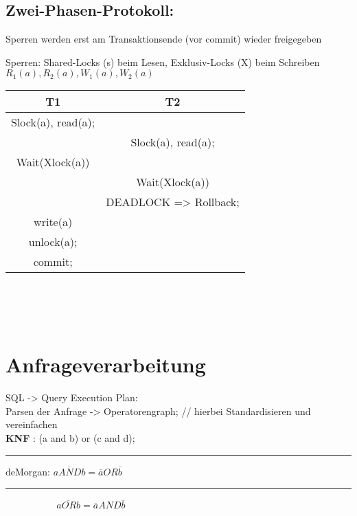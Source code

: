 \subsection{Zwei-Phasen-Protokoll:} Sperren werden erst am Transaktionsende (vor commit) wieder freigegeben

Sperren: Shared-Locks (s) beim Lesen, Exklusiv-Locks (X) beim Schreiben
$R_1(a),R_2(a),W_1(a),W_2(a)$

\begin{tabular}{|c|c|}
\hline
T1 & T2 \\
\hline
Slock(a), read(a); & \\
& Slock(a), read(a);\\
Wait(Xlock(a)) & \\
& Wait(Xlock(a))\\
& DEADLOCK => Rollback;\\
write(a)&\\
unlock(a);&\\
commit;&\\
\hline
\end{tabular}\\ \\ \\



\section{Anfrageverarbeitung}

SQL -> Query Execution Plan:\\
Parsen der Anfrage -> Operatorengraph; // hierbei Standardisieren und vereinfachen  \\
\textbf{KNF} : (a and b) or (c and d); \\
\rule{2em}{0em}deMorgan: $\overline{a AND b} = \overline{a} OR \overline{b}$\\
\rule{2em}{0em}\textcolor{white}{deMorgan :} $\overline{a OR b} = \overline{a} AND \overline{b}$

\newcommand{\proj}{\textcolor{red}{\ensuremath{\pi_{k.nr,p.nr}}}}
\newcommand{\joink}{\textcolor{darkgreen}{\ensuremath{\bowtie_{k.knr = a.knr}}}}
\newcommand{\joina}{\textcolor{darkgreen}{\ensuremath{\bowtie_{a.anr = p.anr}}}}
\newcommand{\selk}{\textcolor{blue}{\ensuremath{\sigma_{k.name = 'x'}} }}
\newcommand{\selor}{\textcolor{blue}{\ensuremath{\sigma_{a.anr > 10~OR~k.knr >10 }}}}
\newcommand{\grpi}[1]{\textcolor{gray}{ \ensuremath{\pi_{ #1 }} }}
\newcommand{\colobr}[3]{\textcolor{#1}{$\underbrace{\textcolor{black}{#2}}_{#3}$}}

